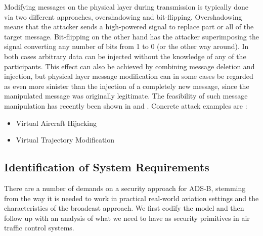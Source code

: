 \documentclass[english]{IEEEtran}
\begin{document}
Modifying messages on the physical layer during transmission is typically
done via two different approaches,\emph{ }overshadowing and bit-flipping.\emph{
}Overshadowing means that the attacker sends a high-powered signal
to replace part or all of the target message.\emph{ }Bit-flipping
on the other hand has the attacker superimposing the signal converting
any number of bits from 1 to 0 (or the other way around). In both
cases arbitrary data can be injected without the knowledge of any
of the participants. This effect can also be achieved by combining
message deletion and injection, but physical layer message modification
can in some cases be regarded as even more sinister than the injection
of a completely new message, since the manipulated message was originally
legitimate. The feasibility of such message manipulation has recently
been shown in \cite{Popper2011} and \cite{Wilhelm2012}. Concrete
attack examples are \cite{schafer2013experimental}:

\vspace{+0.1in}
\begin{itemize}
\item Virtual Aircraft Hijacking
\item Virtual Trajectory Modification\\

\end{itemize}

\subsection{Identification of System Requirements \label{sub:Requirements}}

There are a number of demands on a security approach for ADS-B, stemming
from the way it is needed to work in practical real-world aviation
settings and the characteristics of the broadcast approach. We first
codify the model and then follow up with an analysis of what we need
to have as security primitives in air traffic control systems.\\
\end{document}
